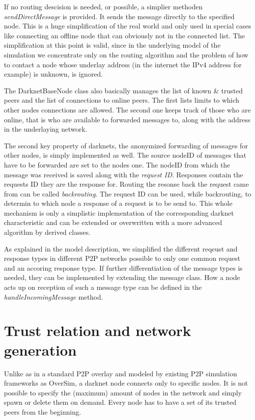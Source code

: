 If no routing descision is needed, or possible, a simplier methoden \emph{sendDirectMessage} is provided. It sends the message directly to the specified node. This is a huge simplification of the real world and only used in special cases like connecting an offline node that can obviously not in the connected list. The simplification at this point is valid, since in the underlying model of the simulation we concentrate only on the routing algorithm and the problem of how to contact a node whose underlay address (in the internet the IPv4 address for example) is unknown, is ignored.

The DarknetBaseNode class also basically manages the list of known & trusted peers and the list of connections to online peers. The first lists limits to which other nodes connections are allowed. The second one keeps track of those who are online, that is who are available to forwarded messages to, along with the address in the underlaying network.

The second key property of darknets, the anonymized forwarding of messages for other nodes, is simply implemented as well. The source nodeID of messages that have to be forwarded are set to the nodes one. The nodeID from which the message was received is saved along with the \emph{request ID}. Responses contain the requests ID they are the response for. Routing the resonse back the request came from can be called \emph{backrouting}. The request ID can be used, while backrouting, to determin to which node a response of a request is to be send to. This whole mechanism is only a simplistic implementation of the corresponding darknet characteristic and can be extended or overwritten with a more advanced algorithm by derived classes.

As explained in the model description, we simplified the different reqeust and response types in different P2P networks possible to only one common request and an accoring response type. If further differentiation of the message types is needed, they can be implemented by extending the message class. How a node acts up on reception of such a message type can be defined in the \emph{handleIncomingMessage} method.

\section{Trust relation and network generation}

Unlike as in a standard P2P overlay and modeled by existing P2P simulation frameworks as OverSim, a darknet node connects only to specific nodes. It is not possible to specify the (maximum) amount of nodes in the network and simply spawn or delete them on demand. Every node has to have a set of its trusted peers from the beginning.


